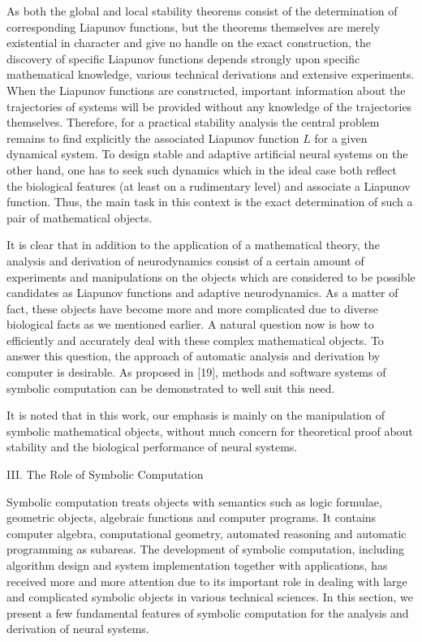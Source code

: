 As both the global and local stability theorems consist of the
determination 
of corresponding Liapunov functions, but the theorems themselves 
are merely existential in character and give no handle on the exact 
construction, the discovery of specific Liapunov functions 
depends strongly upon specific mathematical knowledge,
various technical derivations and extensive experiments. 
When the Liapunov functions are constructed,
important information about the trajectories of systems will be 
provided without any knowledge of the trajectories themselves.
Therefore,
for a practical stability analysis the central problem remains to 
find explicitly the associated Liapunov function $L$ for a given
dynamical system. To design stable and adaptive artificial neural
systems on the other hand, one has to seek such dynamics 
which in the ideal case both reflect the biological 
features (at least on a rudimentary level) and associate a Liapunov
function. 
Thus, the main task in this 
context is the exact determination of such a pair of mathematical
objects. 

It is clear that in addition to the application 
of a mathematical theory, the analysis and derivation of neurodynamics 
consist of a certain amount of experiments and manipulations on the
objects 
which are considered to be possible candidates as Liapunov functions 
and adaptive 
neurodynamics. As a matter of fact, these objects have become more and
more 
complicated due to diverse biological facts as we mentioned earlier. 
A natural question now is how to efficiently and accurately deal with
these 
complex mathematical objects. To answer this question,
 the approach of automatic analysis and derivation by computer is
desirable.
As proposed in [19], methods
and software systems of symbolic computation can be demonstrated to well
suit 
this need. 

It is noted that in this work, our emphasis is mainly on the 
manipulation of symbolic mathematical objects, without much concern for 
theoretical proof about stability and the biological performance of
neural 
systems.\bigskip
\noindent    
\centerline{\sc III. The Role of Symbolic Computation}

\smallskip
\noindent
Symbolic computation treats objects with semantics such as logic
formulae,
geometric objects, algebraic functions and computer programs. It
contains
computer algebra, computational geometry, automated reasoning and
automatic
programming as subareas. The development of symbolic computation,
including
algorithm design and system implementation together with applications,
has
received more and more attention due to its important role in dealing
with large and complicated symbolic objects in various technical
sciences.
In this section, we present a few fundamental features of symbolic 
computation for the analysis and 
derivation of neural systems.

